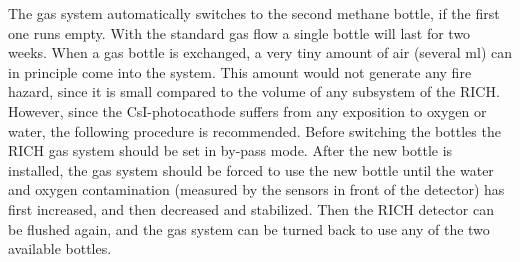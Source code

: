 {The gas system automatically switches to the second methane bottle, if the first one 
runs empty. With the standard gas flow a single bottle will last for two weeks.
When a gas bottle is exchanged, a very tiny amount of air (several ml) can in principle come 
into the system. This amount would not generate any fire hazard, since it is small
compared to the volume of any subsystem of the RICH. However, since the CsI-photocathode
suffers from any exposition to oxygen or water, the following procedure is recommended.
Before switching the bottles the RICH gas system should be set in by-pass mode.
After the new bottle is installed, the gas system should be forced to use the new bottle
until the water and oxygen contamination (measured by the sensors in front of the detector)
has first increased, and then decreased and stabilized. Then the RICH detector can be flushed
again, and the gas system can be turned back to use any of the two available bottles.
}
 
